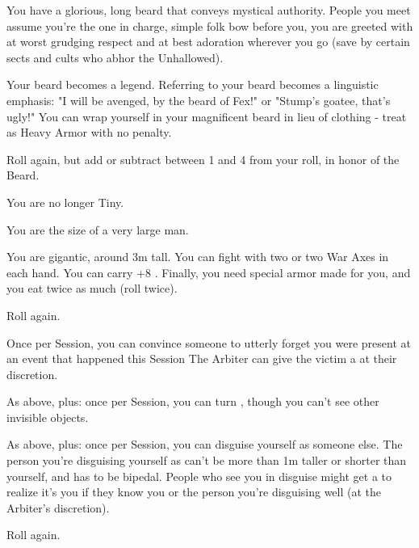 \begin{multicols*}{2}
 You have a glorious, long beard that conveys mystical authority.  People you meet assume you're the one in charge, simple folk bow before you, you are greeted with at worst grudging respect and at best adoration wherever you go (save by certain sects and cults who abhor the Unhallowed).

 Your beard becomes a legend.  Referring to your beard becomes a linguistic emphasis:  "I will be avenged, by the beard of Fex!" or "Stump's goatee, that's ugly!" You can wrap yourself in your magnificent beard in lieu of clothing - treat as Heavy Armor with no \MD penalty.

 Roll again, but add or subtract between 1 and 4 from your roll, in honor of the Beard.

\NC[Name=Bigg'un]

  You are no longer Tiny.

  You are the size of a very large man.

  You are gigantic, around 3m tall.  You can fight  with two  or two War Axes in each hand.  You can carry +8 . Finally, you need special armor made for you, and you eat twice as much (roll  twice).

  Roll again. 

\cbreak

\NC[Name=Camo]

  Once per Session, you can convince someone to utterly forget you were present at an event that happened this Session  The Arbiter can give the victim a  at their discretion.

  As above, plus:  once per Session, you can turn , though you can't see other invisible objects.

  As above, plus:  once per Session, you can disguise yourself as someone else.  The person you're disguising yourself as can't be more than 1m taller or shorter than yourself, and has to be bipedal.  People who see you in disguise might get a  to realize it's you if they know you or the person you're disguising well (at the Arbiter's discretion).

   Roll again. 

\NC[Name=Fishy]


\end{multicols*}
